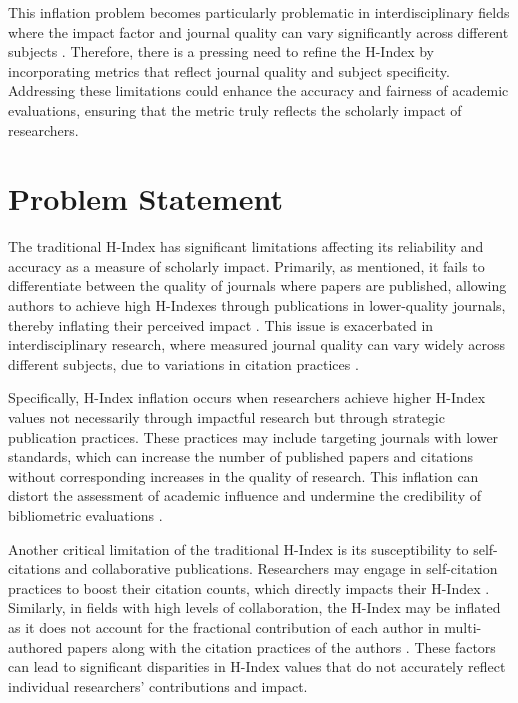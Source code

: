 This inflation problem becomes particularly problematic in interdisciplinary
fields where the impact factor and journal quality can vary significantly
across different subjects \cite{hirsch2005index,waltman2012inconsistency}.
Therefore, there is a pressing need to refine the H-Index by incorporating
metrics that reflect journal quality and subject specificity. Addressing these
limitations could enhance the accuracy and fairness of academic evaluations,
ensuring that the metric truly reflects the scholarly impact of researchers.

\section{Problem Statement}
The traditional H-Index has significant limitations affecting its reliability
and accuracy as a measure of scholarly impact. Primarily, as mentioned, it
fails to differentiate between the quality of journals where papers are
published, allowing authors to achieve high H-Indexes through publications in
lower-quality journals, thereby inflating their perceived impact
\cite{costas2007h,tonta2020monetary}. This issue is exacerbated in
interdisciplinary research, where measured journal quality can vary widely
across different subjects, due to variations in citation practices
\cite{costas2007h,norris2010h}.

Specifically, H-Index inflation occurs when researchers achieve higher H-Index
values not necessarily through impactful research but through strategic
publication practices. These practices may include targeting journals with
lower standards, which can increase the number of published papers and
citations without corresponding increases in the quality of research. This
inflation can distort the assessment of academic influence and undermine the
credibility of bibliometric evaluations \cite{tonta2020monetary}.

Another critical limitation of the traditional H-Index is its susceptibility to
self-citations and collaborative publications. Researchers may engage in
self-citation practices to boost their citation counts, which directly impacts
their H-Index
\cite{hirsch2005index,schreiber2008share,costas2007h,waltman2012inconsistency,norris2010h,bartneck2011detecting,zhivotovsky2008self}.
Similarly, in fields with high levels of collaboration, the H-Index may be
inflated as it does not account for the fractional contribution of each author
in multi-authored papers along with the citation practices of the authors
\cite{schreiber2008share,costas2007h,waltman2012inconsistency,norris2010h,zhivotovsky2008self}.
These factors can lead to significant disparities in H-Index values that do not
accurately reflect individual researchers' contributions and impact.


